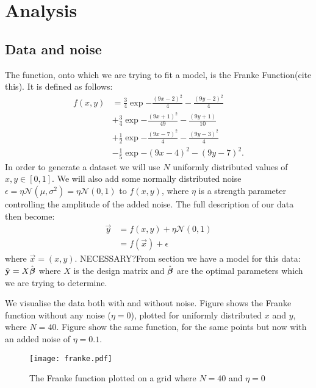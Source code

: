 \section{Analysis}\label{sec:analysis}

    \subsection{Data and noise}\label{sec:data}
        The function, onto which we are trying to fit a model, is the Franke Function(cite this). It is defined as follows:
        \begin{align}\label{eq:francefunc}
            f(x,y) &= \frac{3}{4}\exp{-\frac{(9x-2)^2}{4}-\frac{(9y-2)^2}{4}} \nonumber\\
            &+ \frac{3}{4}\exp{-\frac{(9x+1)^2}{49}-\frac{(9y+1)}{10}} \nonumber\\
            &+ \frac{1}{2}\exp{-\frac{(9x-7)^2}{4}-\frac{(9y-3)^2}{4}} \nonumber\\
            &-\frac{1}{5}\exp{-(9x-4)^2-(9y-7)^2}.
        \end{align}
        In order to generate a dataset we will use $N$ uniformly distributed values of $x,y\in[0,1]$. We will also add some normally distributed noise $\epsilon = \eta\mathcal{N}(\mu,\sigma^2) = \eta\mathcal{N}(0,1)$ to $f(x,y)$, where $\eta$ is a strength parameter controlling the amplitude of the added noise. The full description of our data then become:
        \begin{align}\label{eq:datadescription}
            \vec{y} &= f(x,y) + \eta\mathcal{N}(0,1) \nonumber \\
            &= f(\vec{x}) + \epsilon
        \end{align}
        where $\vec{x} = (x,y)$. 
        NECESSARY?From section  we have a model for this data: $\tilde{\mathbf{y}} = X\hat{\boldsymbol{\beta}}$ where $X$ is the design matrix and $\hat{\boldsymbol{\beta}}$ are the optimal parameters which we are trying to determine. 

        We visualise the data both with and without noise. Figure  shows the Franke function without any noise ($\eta=0$), plotted for uniformly distributed $x$ and $y$, where $N=40$. Figure  show the same function, for the same points but now with an added noise of $\eta=0.1$.

        \begin{figure}
            \texttt{[image: franke.pdf]}
            \caption{The Franke function plotted on a grid where $N=40$ and $\eta=0$}
            \label{fig:franke_function}
        \end{figure}

